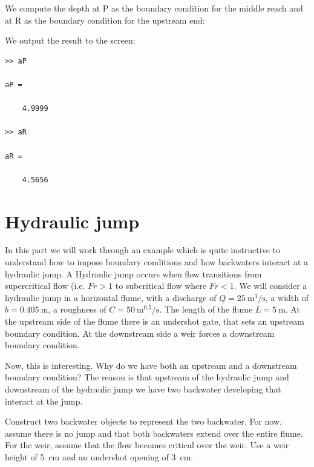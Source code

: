 \documentclass[a4paper]{article}
\begin{document}
  \begin{solution}
    We compute the depth at P as the boundary condition for the middle reach and at R as the boundary condition for the upstream end:
    
    
    We output the result to the screen:
    \begin{lstlisting}
>> aP

aP =

    4.9999

>> aR

aR =

    4.5656
    \end{lstlisting}
    
  \end{solution}




\section{Hydraulic jump}
In this part we will work through an example which is quite instructive to understand how to impose boundary conditions and how backwaters interact at a hydraulic jump. A Hydraulic jump occurs when flow transitions from supercritical flow (i.e. $Fr>1$ to subcritical flow where $Fr<1$. 
We will consider a hydraulic jump in a horizontal flume, with a discharge of $Q=\SI{25}{\cubic\m\per\s}$, a width of $b=\SI{0.405}{\m}$, a roughness of $C=\SI{50}{\m\tothe{0.5}\per\s}$. The length of the flume $L=\SI{5}{\m}$. At the upstream side of the flume there is an undershot gate, that sets an upstream boundary condition. At the downstream side a weir forces a downstream boundary condition.

Now, this is interesting. Why do we have both an upstream and a downstream boundary condition? The reason is that upstream of the hydraulic jump and downstream of the hydraulic jump we have two backwater developing that interact at the jump. 

\begin{exercise}
  Construct two backwater objects to represent the two backwater. For now, assume there is no jump and that both backwaters extend over the entire flume. For the weir, assume that the flow becomes critical over the weir. Use a weir height of \SI{5}{\cm} and an undershot opening of \SI{3}{\cm}.
\end{exercise}
\end{document}
